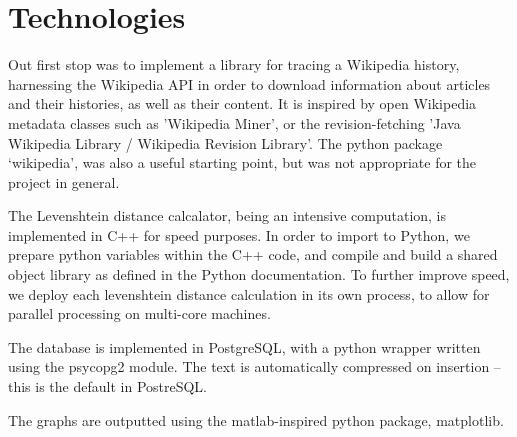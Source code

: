 \section{Technologies}
Out first stop was to implement a library for tracing a Wikipedia
history, harnessing the Wikipedia API in order to download information
about articles and their histories, as well as their content. It is
inspired by open Wikipedia metadata classes such as 'Wikipedia
Miner'\cite{wiki-miner}, or the revision-fetching 'Java Wikipedia
Library / Wikipedia Revision
Library'.\cite{wiki-java}\cite{Ferschke2011} The python package
`wikipedia',\cite{python-wikipedia} was also a useful starting point,
but was not appropriate for the project in general.

The Levenshtein distance calcalator, being an intensive computation,
is implemented in C++ for speed purposes. In order to import to
Python, we prepare python variables within the C++ code, and compile
and build a shared object library as defined in the Python
documentation.\cite{python-extend-c++} To further improve speed, we
deploy each levenshtein distance calculation in its own process, to
allow for parallel processing on multi-core machines.

The database is implemented in PostgreSQL, with a python wrapper
written using the psycopg2 module.\cite{psycopg2} The text is
automatically compressed on insertion -- this is the default in
PostreSQL.\cite{psql-comp} 

The graphs are outputted using the matlab-inspired python package,
matplotlib.\cite{matplotlib} 
